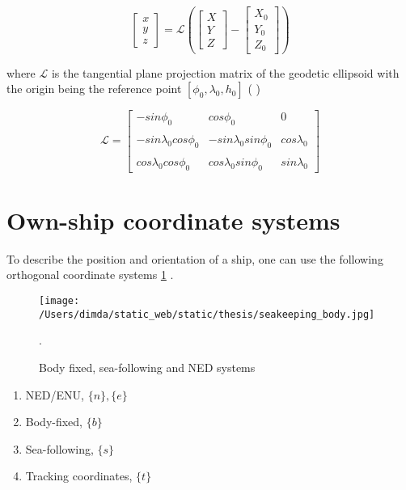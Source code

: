 \begin{equation} \label{eq:transformation_ECEF2ENU}
	\begin{bmatrix}
		x\\
		y\\
		z
	\end{bmatrix}= \mathcal{L}\left(\begin{bmatrix}
		X\\
		Y\\
		Z
	\end{bmatrix} - \begin{bmatrix}
		X_0\\
		Y_0\\
		Z_0
	\end{bmatrix}\right)
\end{equation}


where $\mathcal{L}$ is the tangential plane projection matrix of the geodetic ellipsoid with the origin being the reference point $[\phi_0,\lambda_0,h_0]$ ( )




\begin{equation} \label{eq:Lambda}
\mathcal{L} = \begin{bmatrix}
-sin\phi_0  & cos\phi_0 & 0 \\\\
-sin\lambda_0cos\phi_0 & -sin\lambda_0sin\phi_0 & cos\lambda_0\\\\
cos\lambda_0 cos\phi_0 & cos\lambda_0 sin\phi_0 & sin\lambda_0
\end{bmatrix}
\end{equation}

\section{Own-ship coordinate systems}



To describe the position and orientation of a ship, one can use the following orthogonal coordinate systems  \cref{fig:ownship_frames} \cite{Perez2007} .


\begin{figure}[H] 	
	\centering
	\texttt{[image: /Users/dimda/static\_web/static/thesis/seakeeping\_body.jpg]}
	\caption{Body fixed, sea-following and NED systems \cite{Perez2007}}.
	\label{fig:ownship_frames}	
\end{figure}

\begin{enumerate}
	\item NED/ENU, $\{n\} , \{e\}$
	\item Body-fixed, $\{b\}$
	\item Sea-following, $\{s\}$
	\item Tracking coordinates, $\{t\}$
\end{enumerate}



